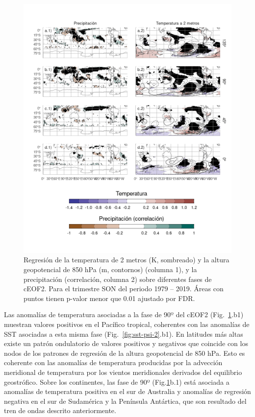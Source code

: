 \documentclass[12pt,oneside]{reedthesis}
\begin{document}
\begin{figure}
\includegraphics{figures/20-ceofs/pp-temp-2-1} \caption{Regresión de la temperatura de 2 metros (K, sombreado) y la altura geopotencial de 850 hPa (m, contornos) (columna 1), y la precipitación (correlación, columna 2) sobre diferentes fases de cEOF2.
Para el trimestre SON del periodo 1979 -- 2019.
Áreas con puntos tienen p-valor menor que 0.01 ajustado por FDR.}\label{fig:pp-temp-2}
\end{figure}

Las anomalías de temperatura asociadas a la fase de 90º del cEOF2 (Fig.~\ref{fig:pp-temp-2}.b1) muestran valores positivos en el Pacífico tropical, coherentes con las anomalías de SST asociadas a esta misma fase (Fig.~\ref{fig:sst-psi-2}.b1).
En latitudes más altas existe un patrón ondulatorio de valores positivos y negativos que coincide con los nodos de los patrones de regresión de la altura geopotencial de 850 hPa.
Esto es coherente con las anomalías de temperatura producidas por la advección meridional de temperatura por los vientos meridionales derivados del equilibrio geostrófico.
Sobre los continentes, las fase de 90º (Fig.\ref{fig:pp-temp-2}b.1) está asociada a anomalías de temperatura positiva en el sur de Australia y anomalías de regresión negativa en el sur de Sudamérica y la Península Antártica, que son resultado del tren de ondas descrito anteriormente.
\end{document}
